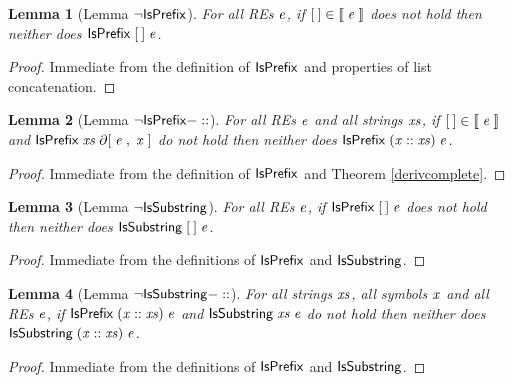 \documentclass[fleqn,10pt]{SelfArx} %
\newtheorem{Lemma}{Lemma}
\theoremstyle{definition}
\newcommand{\D}[1]{\blue{\mathsf{#1}}}
\newcommand{\C}[1]{\red{\mathsf{#1}}}
\newcommand{\F}[1]{\green{\mathsf{#1}}}
\newcommand{\V}[1]{\purple{\mathit{#1}}}
\begin{document}
\begin{Lemma}[Lemma \ensuremath{\F{\neg IsPrefix}}]\label{pref1}
  For all REs \ensuremath{\V{e}}, if \ensuremath{\C{\lbrack\:\rbrack}\;\D{\in\llbracket}\;\V{e}\;\D{\rrbracket}} does not hold then neither does \ensuremath{\D{IsPrefix}\;\C{\lbrack\:\rbrack}\;\V{e}}. 
\end{Lemma}
\begin{proof}
  Immediate from the definition of \ensuremath{\D{IsPrefix}} and properties of list concatenation.
\end{proof}

\begin{Lemma}[Lemma \ensuremath{\F{\neg IsPrefix-::}}]\label{pref2}
  For all REs \ensuremath{\V{e}} and all strings \ensuremath{\V{xs}}, if \ensuremath{\C{\lbrack\:\rbrack}\;\D{\in\llbracket}\;\V{e}\;\D{\rrbracket}} and \ensuremath{\D{IsPrefix}\;\V{xs}\;\F{\partial[}\;\V{e}\;\red{,}\,\;\V{x}\;\F{]}} do not hold then
  neither does \ensuremath{\D{IsPrefix}\;(\V{x}\;\C{::}\;\V{xs})\;\V{e}}.
\end{Lemma}
\begin{proof}
  Immediate from the definition of \ensuremath{\D{IsPrefix}} and Theorem \ref{derivcomplete}.
\end{proof}

\begin{Lemma}[Lemma \ensuremath{\F{\neg IsSubstring}}]\label{sub1}
  For all REs \ensuremath{\V{e}}, if \ensuremath{\D{IsPrefix}\;\C{\lbrack\:\rbrack}\;\V{e}} does not hold then neither does \ensuremath{\D{IsSubstring}\;\C{\lbrack\:\rbrack}\;\V{e}}.
\end{Lemma}
\begin{proof}
  Immediate from the definitions of \ensuremath{\D{IsPrefix}} and \ensuremath{\D{IsSubstring}}.
\end{proof}

\begin{Lemma}[Lemma \ensuremath{\F{\neg IsSubstring-::}}]
  For all strings \ensuremath{\V{xs}}, all symbols \ensuremath{\V{x}} and all REs \ensuremath{\V{e}}, if \ensuremath{\D{IsPrefix}\;(\V{x}\;\C{::}\;\V{xs})\;\V{e}} 
  and \ensuremath{\D{IsSubstring}\;\V{xs}\;\V{e}} do not hold
  then neither does \ensuremath{\D{IsSubstring}\;(\V{x}\;\C{::}\;\V{xs})\;\V{e}}.
\end{Lemma}
\begin{proof}
  Immediate from the definitions of \ensuremath{\D{IsPrefix}} and \ensuremath{\D{IsSubstring}}.
\end{proof}
\end{document}
